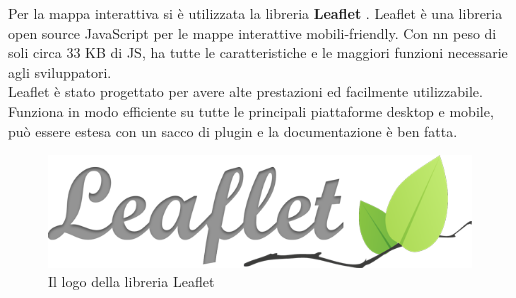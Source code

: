 Per la mappa interattiva si è utilizzata la libreria \textbf{ Leaflet} \cite{LEAFLET}. Leaflet è una libreria open source JavaScript per le mappe interattive mobili-friendly. Con nn peso di soli circa 33 KB di JS, ha tutte le caratteristiche e le maggiori funzioni necessarie agli sviluppatori.\\
Leaflet è stato progettato per avere alte prestazioni ed facilmente utilizzabile. Funziona in modo efficiente su tutte le principali piattaforme desktop e mobile, può essere estesa con un sacco di plugin e la documentazione è ben fatta.\\

\begin{figure}[H]
	\centering
	\includegraphics[scale=0.5]{Implementazione/leaflet.png}
	\caption{Il logo della libreria Leaflet}
	\label{fig:leaflet}
\end{figure}

